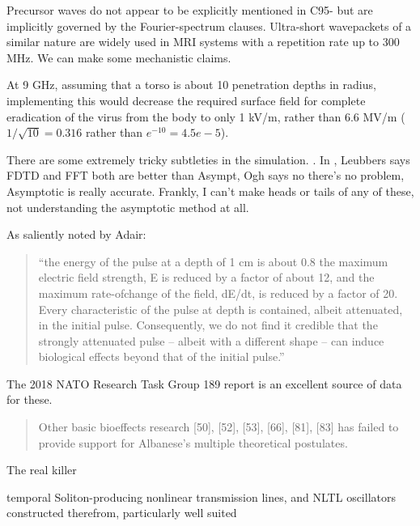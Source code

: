 \documentclass[paper.tex]{subfiles}
\begin{document}
Precursor waves do not appear to be explicitly mentioned in C95- but are implicitly governed by the Fourier-spectrum clauses. Ultra-short wavepackets of a similar nature are widely used in MRI systems with a repetition rate up to 300 MHz. We can make some mechanistic claims.

At 9 GHz, assuming that a torso is about 10 penetration depths in radius, implementing this would decrease the required surface field for complete eradication of the virus from the body to only 1 kV/m, rather than 6.6 MV/m ($1/\sqrt{10}=0.316$ rather than $e^{-10}=4.5e-5$). 




There are some extremely tricky subtleties in the simulation.  \cite{propagation1992}. In \cite{Comments1993}, Leubbers says FDTD and FFT both are better than Asympt, Ogh says no there's no problem, Asymptotic is really accurate. Frankly, I can't make heads or tails of any of these, not understanding the asymptotic method at all.



As saliently noted by Adair:

\begin{quote}
	“the energy of the pulse at a depth of 1 cm is about 0.8%
	the maximum electric field strength, E is reduced by a factor of about 12, and the maximum rate-ofchange of the field, dE/dt, is reduced by a factor of 20. Every characteristic of the pulse at depth is
	contained, albeit attenuated, in the initial pulse. Consequently, we do not find it credible that the
	strongly attenuated pulse – albeit with a different shape – can induce biological effects beyond that of
	the initial pulse.”
\end{quote}


The 2018 NATO Research Task Group 189 report \cite{treatyelectromagnetic} is an excellent source of data for these. 

\begin{quote}
	Other basic bioeffects research [50], [52], [53], [66], [81], [83] has failed to provide support for Albanese’s multiple	theoretical postulates.
\end{quote}

The real killer 





temporal Soliton-producing nonlinear transmission lines, and NLTL oscillators constructed therefrom, particularly well suited 
\end{document}
